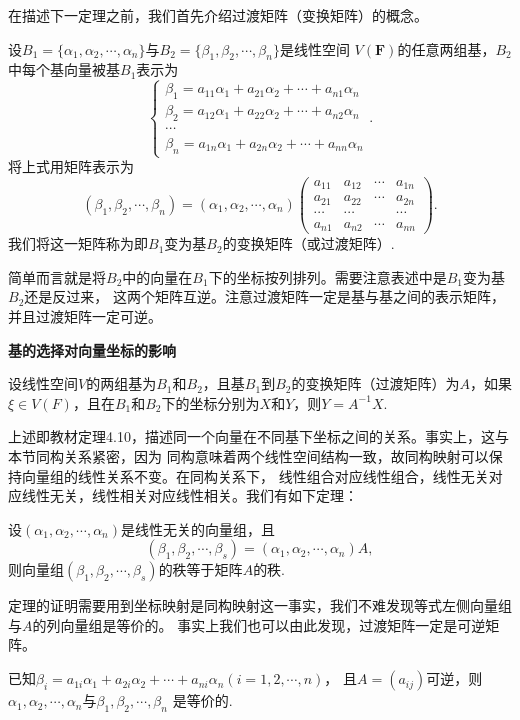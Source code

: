 在描述下一定理之前，我们首先介绍过渡矩阵（变换矩阵）的概念。
\begin{definition}
	设$B_1=\{\alpha_1,\alpha_2,\cdots,\alpha_n\}$与$B_2=\{\beta_1,\beta_2,\cdots,\beta_n\}$是线性空间
	$V(\mathbf{F})$的任意两组基，$B_2$中每个基向量被基$B_1$表示为
	$$\begin{cases}
		\beta_1=a_{11}\alpha_1+a_{21}\alpha_2+\cdots+a_{n1}\alpha_n \\
		\beta_2=a_{12}\alpha_1+a_{22}\alpha_2+\cdots+a_{n2}\alpha_n \\
		\cdots \\
		\beta_n=a_{1n}\alpha_1+a_{2n}\alpha_2+\cdots+a_{nn}\alpha_n
	\end{cases}.$$
	将上式用矩阵表示为
	$$(\beta_1,\beta_2,\cdots,\beta_n)=(\alpha_1,\alpha_2,\cdots,\alpha_n)\begin{pmatrix}
		a_{11} & a_{12} & \cdots & a_{1n} \\
		a_{21} & a_{22} & \cdots & a_{2n} \\
		\cdots & \cdots &        & \cdots \\
		a_{n1} & a_{n2} & \cdots & a_{nn}
	\end{pmatrix}.$$
	我们将这一矩阵称为即$B_1$变为基$B_2$的变换矩阵（或过渡矩阵）.
\end{definition}
简单而言就是将$B_2$中的向量在$B_1$下的坐标按列排列。需要注意表述中是$B_1$变为基$B_2$还是反过来，
这两个矩阵互逆。注意过渡矩阵一定是基与基之间的表示矩阵，并且过渡矩阵一定可逆。
\begin{theorem}
	\textbf{基的选择对向量坐标的影响}
	
	设线性空间$V$的两组基为$B_1$和$B_2$，且基$B_1$到$B_2$的变换矩阵（过渡矩阵）为$A$，如果
	$\xi \in V(F)$，且在$B_1$和$B_2$下的坐标分别为$X$和$Y$，则$Y=A^{-1}X$.
\end{theorem}
上述即教材定理4.10，描述同一个向量在不同基下坐标之间的关系。事实上，这与本节同构关系紧密，因为
同构意味着两个线性空间结构一致，故同构映射可以保持向量组的线性关系不变。在同构关系下，
线性组合对应线性组合，线性无关对应线性无关，线性相关对应线性相关。我们有如下定理：
\begin{theorem}
	设$(\alpha_1,\alpha_2,\cdots,\alpha_n)$是线性无关的向量组，且
	$$(\beta_1,\beta_2,\cdots,\beta_s)=(\alpha_1,\alpha_2,\cdots,\alpha_n)A,$$
	则向量组$(\beta_1,\beta_2,\cdots,\beta_s)$的秩等于矩阵$A$的秩.
\end{theorem}
定理的证明需要用到坐标映射是同构映射这一事实，我们不难发现等式左侧向量组与$A$的列向量组是等价的。
事实上我们也可以由此发现，过渡矩阵一定是可逆矩阵。
\begin{theorem}
	已知$\beta_i=a_{1i}\alpha_1+a_{2i}\alpha_2+\cdots+a_{ni}\alpha_n(i=1,2,\cdots,n)$，
	且$A=(a_{ij})$可逆，则$\alpha_1,\alpha_2,\cdots,\alpha_n$与$\beta_1,\beta_2,\cdots,\beta_n$
	是等价的.
\end{theorem}
